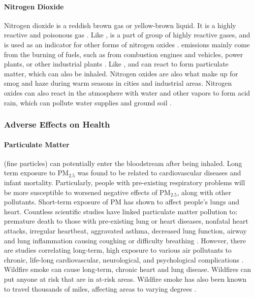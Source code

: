 \paragraph{Nitrogen Dioxide}
Nitrogen dioxide \ndo is a reddish brown gas or yellow-brown liquid. It is a
highly reactive and poisonous gas \cite{pubchem-no2}. Like \sdo, \ndo is a part
of group of highly reactive gases, and is used as an indicator for other forms
of nitrogen oxides \nox. \ndo emissions mainly come from the burning of fuels,
such as from combustion engines and vehicles, power plants, or other industrial
plants \cite{epa-no2-basics}. Like \sox, \ndo and \nox can react to form
particulate matter, which can also be inhaled. Nitrogen oxides are also what
make up for smog and haze during warm seasons in cities and industrial areas.
Nitrogen oxides can also react in the atmosphere with water and other vapors to
form acid rain, which can pollute water supplies and ground soil
\cite{epa-no2-basics}.


\subsubsection{Adverse Effects on Health}

\paragraph{Particulate Matter} (fine particles) can potentially enter the
bloodstream after being inhaled. Long term exposure to PM$_{2.5}$ was found to
be related to cardiovascular diseases and infant mortality.  Particularly,
people with pre-existing respiratory problems will be more susceptible to
worsened negative effects of PM$_{2.5}$, along with other pollutants. Short-term
exposure of PM has shown to affect people's lungs and heart. Countless
scientific studies have linked particulate matter pollution to: premature death
to those with pre-existing lung or heart diseases, nonfatal heart attacks,
irregular heartbeat, aggravated asthma, decreased lung function, airway and lung
inflammation causing coughing or difficulty breathing
\cite{epa-pm-health-effects}. However, there are
studies correlating long-term, high exposure to various air pollutants to
chronic, life-long cardiovascular, neurological, and psychological
complications \cite{health-impacts-air-pollution-review}. Wildfire smoke can
cause long-term, chronic heart and lung disease. Wildfires can put anyone at
risk that are in at-risk areas. Wildfire smoke has also been known to travel
thousands of miles, affecting areas to varying degrees
\cite{epa-how-smoke-affects-health}.

